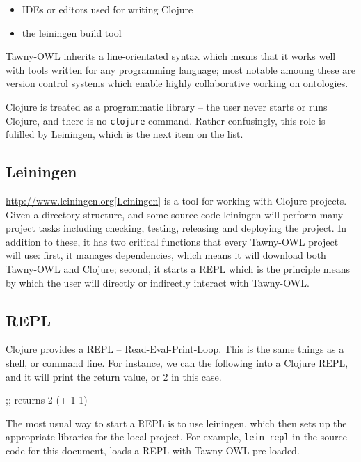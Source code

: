 \begin{itemize}
\item IDEs or editors used for writing Clojure
\item the leiningen build tool
\end{itemize}

Tawny-OWL inherits a line-orientated syntax which means that it works
well with tools written for any programming language; most notable
amoung these are version control systems which enable highly
collaborative working on ontologies.

Clojure is treated as a programmatic library -- the user never starts or
runs Clojure, and there is no \texttt{clojure} command. Rather confusingly,
this role is fulilled by Leiningen, which is the next item on the list.

\subsection{Leiningen}
\label{sec-3-3}

\url{http://www.leiningen.org[Leiningen}] is a tool for working with Clojure
projects. Given a directory structure, and some source code leiningen
will perform many project tasks including checking, testing, releasing
and deploying the project. In addition to these, it has two critical
functions that every Tawny-OWL project will use: first, it manages
dependencies, which means it will download both Tawny-OWL and Clojure;
second, it starts a REPL which is the principle means by which the user
will directly or indirectly interact with Tawny-OWL.

\subsection{REPL}
\label{sec-3-4}

Clojure provides a REPL -- Read-Eval-Print-Loop. This is the same things
as a shell, or command line. For instance, we can the following into a
Clojure REPL, and it will print the return value, or 2 in this case.


\begin{tawny}
;; returns 2 
(+ 1 1)
\end{tawny}

The most usual way to start a REPL is to use leiningen, which then sets
up the appropriate libraries for the local project. For example,
\texttt{lein repl} in the source code for this document, loads a REPL with
Tawny-OWL pre-loaded.


